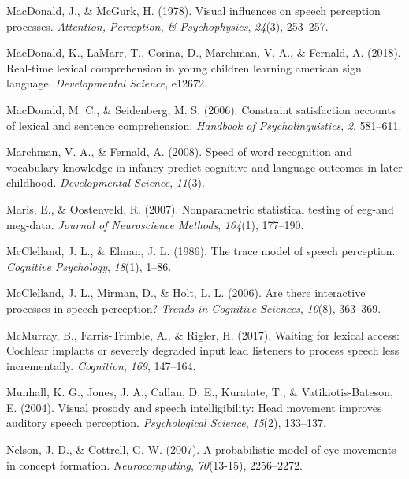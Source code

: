 \documentclass[english,floatsintext,man]{apa6}
\begin{document}
\leavevmode\hypertarget{ref-macdonald1978visual}{}%
MacDonald, J., \& McGurk, H. (1978). Visual influences on speech
perception processes. \emph{Attention, Perception, \& Psychophysics},
\emph{24}(3), 253--257.

\leavevmode\hypertarget{ref-macdonald2018real}{}%
MacDonald, K., LaMarr, T., Corina, D., Marchman, V. A., \& Fernald, A.
(2018). Real-time lexical comprehension in young children learning
american sign language. \emph{Developmental Science}, e12672.

\leavevmode\hypertarget{ref-macdonald2006constraint}{}%
MacDonald, M. C., \& Seidenberg, M. S. (2006). Constraint satisfaction
accounts of lexical and sentence comprehension. \emph{Handbook of
Psycholinguistics}, \emph{2}, 581--611.

\leavevmode\hypertarget{ref-marchman2008speed}{}%
Marchman, V. A., \& Fernald, A. (2008). Speed of word recognition and
vocabulary knowledge in infancy predict cognitive and language outcomes
in later childhood. \emph{Developmental Science}, \emph{11}(3).

\leavevmode\hypertarget{ref-maris2007nonparametric}{}%
Maris, E., \& Oostenveld, R. (2007). Nonparametric statistical testing
of eeg-and meg-data. \emph{Journal of Neuroscience Methods},
\emph{164}(1), 177--190.

\leavevmode\hypertarget{ref-mcclelland1986trace}{}%
McClelland, J. L., \& Elman, J. L. (1986). The trace model of speech
perception. \emph{Cognitive Psychology}, \emph{18}(1), 1--86.

\leavevmode\hypertarget{ref-mcclelland2006there}{}%
McClelland, J. L., Mirman, D., \& Holt, L. L. (2006). Are there
interactive processes in speech perception? \emph{Trends in Cognitive
Sciences}, \emph{10}(8), 363--369.

\leavevmode\hypertarget{ref-mcmurray2017waiting}{}%
McMurray, B., Farris-Trimble, A., \& Rigler, H. (2017). Waiting for
lexical access: Cochlear implants or severely degraded input lead
listeners to process speech less incrementally. \emph{Cognition},
\emph{169}, 147--164.

\leavevmode\hypertarget{ref-munhall2004visual}{}%
Munhall, K. G., Jones, J. A., Callan, D. E., Kuratate, T., \&
Vatikiotis-Bateson, E. (2004). Visual prosody and speech
intelligibility: Head movement improves auditory speech perception.
\emph{Psychological Science}, \emph{15}(2), 133--137.

\leavevmode\hypertarget{ref-nelson2007probabilistic}{}%
Nelson, J. D., \& Cottrell, G. W. (2007). A probabilistic model of eye
movements in concept formation. \emph{Neurocomputing}, \emph{70}(13-15),
2256--2272.
\end{document}
